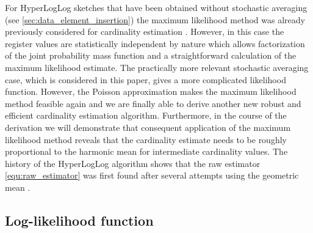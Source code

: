 \documentclass[a4paper]{scrartcl}
\begin{document}
For HyperLogLog sketches that have been obtained without stochastic averaging (see \cref{sec:data_element_insertion}) the maximum likelihood method was already previously considered for cardinality estimation \cite{Clifford2012}. However, in this case the register values are statistically independent by nature which 
allows factorization of the joint probability mass function and a straightforward calculation of the maximum likelihood estimate. The practically more relevant stochastic averaging case, which is considered in this paper, gives a more complicated likelihood function. However, the Poisson approximation makes the maximum likelihood method feasible again and we are finally able to derive another new robust and efficient cardinality estimation algorithm. Furthermore, in the course of the derivation we will demonstrate that consequent application of the maximum likelihood method reveals that the cardinality estimate needs to be roughly proportional to the harmonic mean for intermediate cardinality values. The history of the HyperLogLog algorithm shows that the raw estimator \eqref{equ:raw_estimator} was first found after several attempts using the geometric mean \cite{Flajolet2007, Durand2003}.

\subsection{Log-likelihood function}
\end{document}
